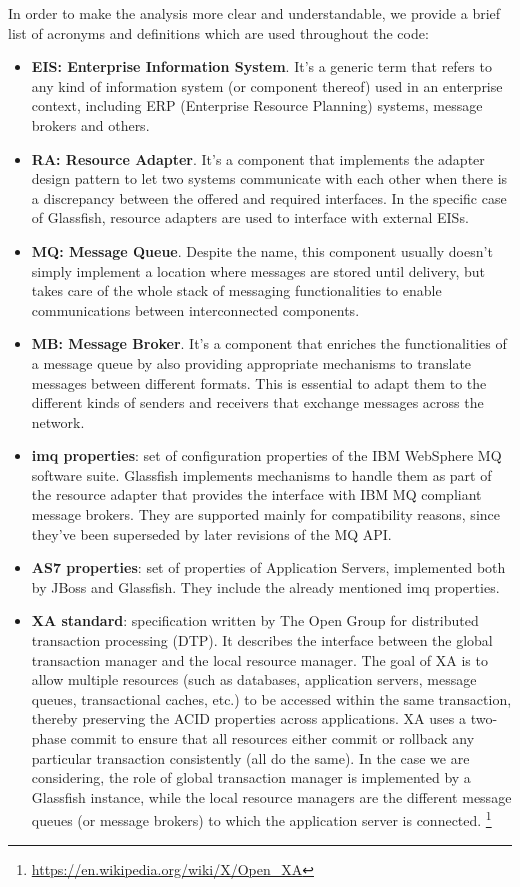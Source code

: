 In order to make the analysis more clear and understandable, we provide a brief list of acronyms and definitions which are used throughout the code:
\begin{itemize}
	\item \textbf{EIS: Enterprise Information System}. It's a generic term that refers to any kind of information system (or component thereof) used in an enterprise context, including ERP (Enterprise Resource Planning) systems, message brokers and others.
	\item \textbf{RA: Resource Adapter}. It's a component that implements the adapter design pattern to let two systems communicate with each other when there is a discrepancy between the offered and required interfaces. In the specific case of Glassfish, resource adapters are used to interface with external EISs.
	\item \textbf{MQ: Message Queue}. Despite the name, this component usually doesn't simply implement a location where messages are stored until delivery, but takes care of the whole stack of messaging functionalities to enable communications between interconnected components. 
	\item \textbf{MB: Message Broker}. It's a component that enriches the functionalities of a message queue by also providing appropriate mechanisms to translate messages between different formats. This is essential to adapt them to the different kinds of senders and receivers that exchange messages across the network. 
	\item \textbf{imq properties}: set of configuration properties of the IBM WebSphere MQ software suite. Glassfish implements mechanisms to handle them as part of the resource adapter that provides the interface with IBM MQ compliant message brokers. They are supported mainly for compatibility reasons, since they've been superseded by later revisions of the MQ API. 
	\item \textbf{AS7 properties}: set of properties of Application Servers, implemented both by JBoss and Glassfish. They include the already mentioned imq properties. 
	\item \textbf{XA standard}: specification written by The Open Group for distributed transaction processing (DTP). It describes the interface between the global transaction manager and the local resource manager. The goal of XA is to allow multiple resources (such as databases, application servers, message queues, transactional caches, etc.) to be accessed within the same transaction, thereby preserving the ACID properties across applications. XA uses a two-phase commit to ensure that all resources either commit or rollback any particular transaction consistently (all do the same). In the case we are considering, the role of global transaction manager is implemented by a Glassfish instance, while the local resource managers are the different message queues (or message brokers) to which the application server is connected. \footnote{\url{https://en.wikipedia.org/wiki/X/Open_XA}}

\end{itemize}
